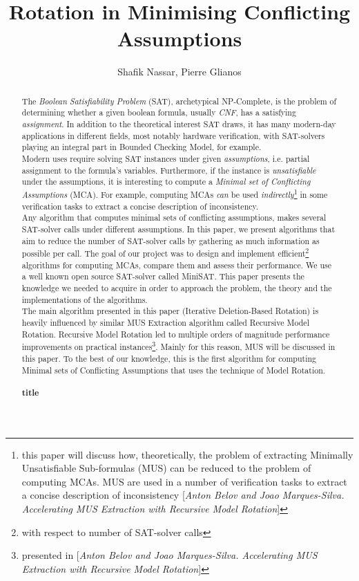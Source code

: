 \documentclass[]{article}
\title{Rotation in Minimising Conflicting Assumptions}
\author{Shafik Nassar, Pierre Glianos}
\begin{document}
	
	\maketitle
	
	\begin{abstract}
		
		The \textit{Boolean Satisfiability Problem} (SAT), archetypical NP-Complete, is the problem of determining whether a given boolean formula, usually \textit{CNF}, has a satisfying \textit{assignment}. In addition to the theoretical interest SAT draws, it has many modern-day applications in different fields, most notably hardware verification, with SAT-solvers playing an integral part in Bounded Checking Model, for example.\\
		Modern uses require solving SAT instances under given \textit{assumptions}, i.e. partial assignment to the formula's variables. Furthermore, if the instance is \textit{unsatisfiable} under the assumptions, it is interesting to compute a \textit{Minimal set of Conflicting Assumptions} (MCA). For example, computing MCAs \textit{can} be used \textit{indirectly}\footnote{this paper will discuss how, theoretically, the problem of extracting Minimally Unsatisfiable Sub-formulas (MUS) can be reduced to the problem of computing MCAs.  MUS are used in a number of verification tasks to extract a concise description of inconsistency [\textit{Anton Belov and Joao Marques-Silva. Accelerating MUS Extraction with Recursive Model Rotation}]} in some verification tasks to extract a concise description of inconsistency.\\
		Any algorithm that computes minimal sets of conflicting assumptions, makes several SAT-solver calls under different assumptions. In this paper, we present algorithms that aim to reduce the number of SAT-solver calls by gathering as much information as possible per call.
		The goal of our project was to design and implement efficient\footnote{with respect to number of SAT-solver calls} algorithms for computing MCAs, compare them and assess their performance. We use a well known open source SAT-solver called MiniSAT. This paper presents the knowledge we needed to acquire in order to approach the problem, the theory and the implementations of the algorithms. \\
		The main algorithm presented in this paper (Iterative Deletion-Based Rotation) is heavily influenced by similar MUS Extraction algorithm called Recursive Model Rotation. Recursive Model Rotation led to multiple orders of magnitude performance improvements on practical instances\footnote{presented in [\textit{Anton Belov and Joao Marques-Silva. Accelerating MUS Extraction with Recursive Model Rotation}]}. Mainly for this reason, MUS will be discussed in this paper. To the best of our knowledge, this is the first algorithm for computing Minimal sets of Conflicting Assumptions that uses the technique of Model Rotation.
		
		\paragraph{title}
		
	\end{abstract}
	
\end{document}
